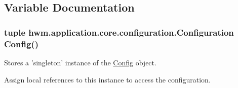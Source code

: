 \subsection{Variable Documentation}
\hypertarget{namespacehwm_1_1application_1_1core_1_1configuration_adda0a880b39910458ecbd29d662d1b19}{
\subsubsection[{Configuration}]{\setlength{\rightskip}{0pt plus 5cm}tuple hwm.\-application.\-core.\-configuration.\-Configuration {\bf Config}()}}\label{namespacehwm_1_1application_1_1core_1_1configuration_adda0a880b39910458ecbd29d662d1b19}


Stores a 'singleton' instance of the \hyperlink{classhwm_1_1application_1_1core_1_1configuration_1_1_config}{Config} object. 

Assign local references to this instance to access the configuration. 